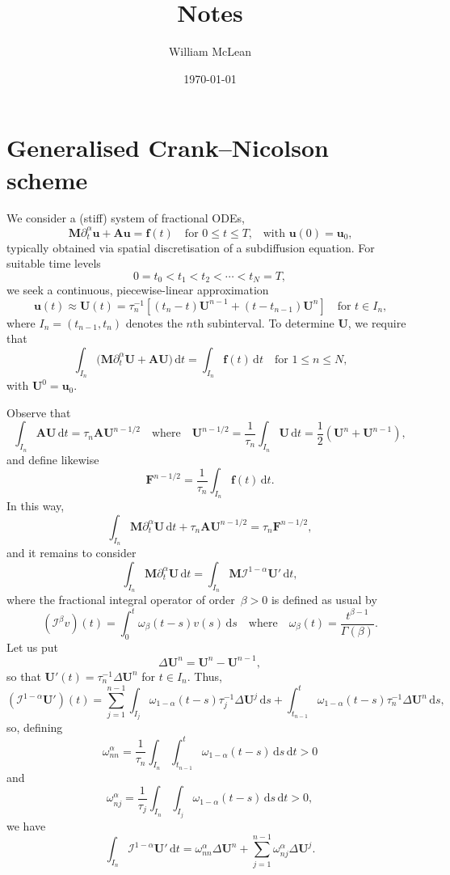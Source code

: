 \documentclass[a4paper,12pt]{article}
\title{Notes}
\date{\today}
\author{William McLean}
\newcommand{\bs}[1]{\boldsymbol{#1}}
\newcommand{\ud}{\mathrm{d}}
\begin{document}
\maketitle
\tableofcontents
\section{Generalised Crank--Nicolson scheme}
We consider a (stiff) system of fractional ODEs,
\[
\bs{M}\partial_t^\alpha\bs{u}+\bs{A}\bs{u}=\bs{f}(t)
    \quad\text{for $0\le t\le T$,}\quad\text{with $\bs{u}(0)=\bs{u}_0$,}
\]
typically obtained via spatial discretisation of a subdiffusion equation.
For suitable time levels
\[
0=t_0<t_1<t_2<\cdots<t_N=T,
\]
we seek a continuous, piecewise-linear approximation
\[
\bs{u}(t)\approx\bs{U}(t)=\tau_n^{-1}[(t_n-t)\bs{U}^{n-1}+(t-t_{n-1})\bs{U}^n]
\quad\text{for $t\in I_n$,}
\]
where $I_n=(t_{n-1},t_n)$ denotes the $n$th subinterval.  To determine $\bs{U}$,
we require that
\begin{equation}\label{eq: gen CN}
\int_{I_n}\bigl(\bs{M}\partial_t^\alpha\bs{U}+\bs{A}\bs{U}\bigr)\,\ud t
    =\int_{I_n}\bs{f}(t)\,\ud t\quad\text{for $1\le n\le N$,}
\end{equation}
with $\bs{U}^0=\bs{u}_0$.

Observe that
\[
\int_{I_n}\bs{A}\bs{U}\,\ud t=\tau_n\bs{A}\bs{U}^{n-1/2}\quad\text{where}\quad
\bs{U}^{n-1/2}=\frac{1}{\tau_n}\int_{I_n}\bs{U}\,\ud t
    =\frac{1}{2}(\bs{U}^n+\bs{U}^{n-1}),
\]
and define likewise
\[
\bs{F}^{n-1/2}=\frac{1}{\tau_n}\int_{I_n}\bs{f}(t)\,\ud t.
\]
In this way,
\[
\int_{I_n}\bs{M}\partial_t^\alpha\bs{U}\,\ud t+\tau_n\bs{A}\bs{U}^{n-1/2}
    =\tau_n\bs{F}^{n-1/2},
\]
and it remains to consider
\[
\int_{I_n}\bs{M}\partial_t^\alpha\bs{U}\,\ud t
    =\int_{I_n}\bs{M}\mathcal{I}^{1-\alpha}\bs{U}'\,\ud t,
\]
where the fractional integral operator of order~$\beta>0$ is defined as usual by
\[
(\mathcal{I}^\beta v)(t)=\int_0^t\omega_\beta(t-s)v(s)\,\ud s
\quad\text{where}\quad\omega_\beta(t)=\frac{t^{\beta-1}}{\Gamma(\beta)}.
\]
Let us put
\[
\Delta\bs{U}^n=\bs{U}^n-\bs{U}^{n-1},
\]
so that $\bs{U}'(t)=\tau_n^{-1}\Delta\bs{U}^n$ for $t\in I_n$. Thus,
\[
(\mathcal{I}^{1-\alpha}\bs{U}')(t)=\sum_{j=1}^{n-1}\int_{I_j}
    \omega_{1-\alpha}(t-s)\tau_j^{-1}\Delta\bs{U}^j\,\ud s
    +\int_{t_{n-1}}^t\omega_{1-\alpha}(t-s)\tau_n^{-1}\Delta\bs{U}^n\,\ud s,
\]
so, defining
\[
\omega^\alpha_{nn}=\frac{1}{\tau_n}\int_{I_n}\int_{t_{n-1}}^t
    \omega_{1-\alpha}(t-s)\,\ud s\,\ud t>0
\]
and
\[
\omega^\alpha_{nj}=\frac{1}{\tau_j}\int_{I_n}\int_{I_j}
    \omega_{1-\alpha}(t-s)\,\ud s\,\ud t>0,
\]
we have
\[
\int_{I_n}\mathcal{I}^{1-\alpha}\bs{U}'\,\ud t
    =\omega^\alpha_{nn}\Delta\bs{U}^n
    +\sum_{j=1}^{n-1}\omega^\alpha_{nj}\Delta\bs{U}^j.
\]
\end{document}
